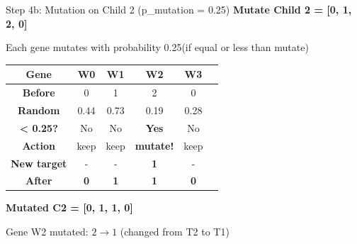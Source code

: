 \documentclass[aspectratio=169,10pt]{beamer}
\begin{document}
\begin{frame}{Step 4b: Mutation on Child 2 (p\_mutation = 0.25)}
  \colorbox{navymid}{\color{teallt}\bfseries Mutate Child 2 = [0, 1, 2, 0]}
  
  \vspace{0.3cm}
  {\small Each gene mutates with probability 0.25(if equal or less than mutate)}

  \vspace{0.3cm}
  \centering
  \begin{tabular}{cccccc}
    \toprule
    \rowcolor{navymid}
    \color{white}\textbf{Gene} & \color{white}\textbf{W0} & \color{white}\textbf{W1} & \color{white}\textbf{W2} & \color{white}\textbf{W3} \\
    \midrule
    \textbf{Before} & 0 & 1 & 2 & 0 \\
    \midrule
    \textbf{Random} & 0.44 & 0.73 & 0.19 & 0.28 \\
    \textbf{< 0.25?} & No & No & \cellcolor{amber}\textbf{Yes} & No \\
    \midrule
    \textbf{Action} & keep & keep & \cellcolor{amber}\textbf{mutate!} & keep \\
    \textbf{New target} & - & - & \cellcolor{amber}\textbf{1} & - \\
    \midrule
    \rowcolor{lightyellow}
    \cellcolor{amber}\color{white}\textbf{After} & \textbf{0} & \textbf{1} & \cellcolor{amber}\color{white}\textbf{1} & \textbf{0} \\
    \bottomrule
  \end{tabular}
  
  \vspace{0.3cm}
  \colorbox{amber}{\color{white}\bfseries Mutated C2 = [0, 1, 1, 0]}
  
  \vspace{0.2cm}
  {\small Gene W2 mutated: $2 \to 1$ (changed from T2 to T1)}
\end{frame}
\end{document}
